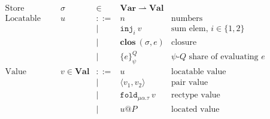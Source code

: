 \documentclass[10pt]{article}
\makeatletter
\newcommand{\kw}[1]{\ensuremath{\mathtt{#1}}}
\newcommand{\trec}[2]{\ensuremath{\mu {#1}.{#2}}}
\newcommand{\ebinop}[2]{\ensuremath{{#1}~\oplus~{#2}}}
\newcommand{\elet}[3]{\ensuremath{\kw{let}~#1\, =\, #2~\kw{in}\;{#3}}}
\newcommand{\ereveal}[4]{\ensuremath{\kw{reveal}^{#1}_{#4}~{#2}~{#3}}}
\newcommand{\econd}[3]{\ensuremath{\kw{match}~{#1}~\kw{with}~x.{#2} \diamond {#3}}}
\newcommand{\emux}[3]{\ensuremath{\kw{mux}~{#1}~\kw{?}~{#2}~\kw{:}~{#3}}}
\newcommand{\eshare}[4]{\ensuremath{\kw{share}^{#2}_{#1}~{#3}~{#4}}}
\newcommand{\einj}[2]{\ensuremath{\kw{inj}_{#1}~{#2}}}
\newcommand{\epair}[2]{\ensuremath{\langle {#1}, {#2} \rangle}}
\newcommand{\eproj}[2]{\ensuremath{\kw{\#}}_{#1}~{#2}}
\newcommand{\eapp}[2]{\ensuremath{{#1}~{#2}}}
\newcommand{\efold}[2]{\ensuremath{\kw{fold}_{#1}~{#2}}}
\newcommand{\eunfold}[1]{\ensuremath{\kw{unfold}~{#1}}}
\newcommand{\vshare}[3]{\ensuremath{\{{#3}\}^{#1}_{#2}}}
\newcommand{\vloc}[2]{\ensuremath{{#1}\kw{@}{#2}}}
\newcommand{\vclos}[2]{\ensuremath{\mathbf{clos}~({#1},{#2})}}
\newcommand{\env}{\ensuremath{\sigma}}
\makeatother
\begin{document}
\begin{figure}
  \[\begin{array}{rlcll}
      \text{Store} & \sigma & \in & \mathbf{Var} \rightharpoonup \mathbf{Val}\\
      \text{Locatable value} & u & ::=  & n & \text{numbers} \\
                             && \mid & \einj{i}{v} & \text{sum elem, }i \in \{1,2\}\\
                             && \mid & \vclos{\env}{e}  & \text{closure} \\
                             && \mid & \vshare{Q}{\psi}{e} & \text{$\psi$-$Q$ share of evaluating $e$} \\
      \text{Value} & v  \in \mathbf{Val} & ::=  & u & \text{locatable value}\\
                       && \mid & \epair{v_1}{v_2} & \text{pair value}\\
                       && \mid & \efold{\trec{\alpha}{\tau}}{v} & \text{rectype value}\\
                       && \mid & \vloc{u}{P} & \text{located value}\\
    \end{array}
  \]


\end{figure}
\end{document}
